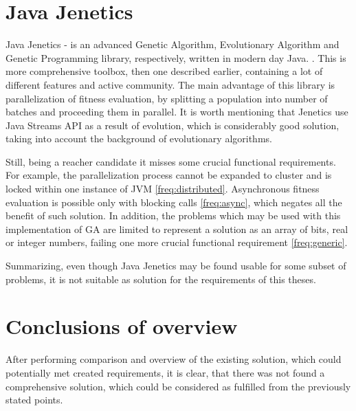 \section{Java Jenetics}

Java Jenetics - is an advanced Genetic Algorithm, Evolutionary Algorithm and Genetic Programming library, respectively, written in modern day Java. \cite{jenetics_manual}. This is more comprehensive toolbox, then one described earlier, containing a lot of different features and active community. The main advantage of this library is parallelization of fitness evaluation, by splitting a population into number of batches and proceeding them in parallel. It is worth mentioning that Jenetics use Java Streams API as a result of evolution, which is considerably good solution, taking into account the background of evolutionary algorithms. 

Still, being a reacher candidate it misses some crucial functional requirements. For example, the parallelization process cannot be expanded to cluster and is locked within one instance of JVM \ref{freq:distributed}. Asynchronous fitness evaluation is possible only with blocking calls \ref{freq:async}, which negates all the benefit of such solution. In addition, the problems which may be used with this implementation of GA are limited to represent a solution as an array of bits, real or integer numbers, failing one more crucial functional requirement \ref{freq:generic}.

Summarizing, even though Java Jenetics may be found usable for some subset of problems, it is not suitable as solution for the requirements of this theses.

\section{Conclusions of overview}

After performing comparison and overview of the existing solution, which could potentially met created requirements, it is clear, that there was not found a comprehensive solution, which could be considered as fulfilled from the previously stated points. 

